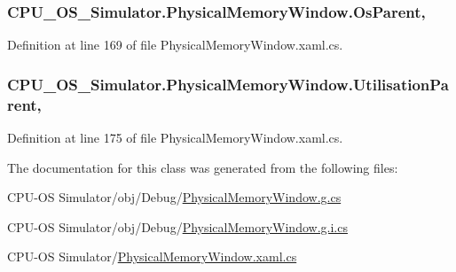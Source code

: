 \hypertarget{class_c_p_u___o_s___simulator_1_1_physical_memory_window_a0a61a168c75bdc6c63c3cff40018bab1}{}
\subsubsection[{Os\+Parent}]{ C\+P\+U\+\_\+\+O\+S\+\_\+\+Simulator.\+Physical\+Memory\+Window.\+Os\+Parent\hspace{0.3cm}{\ttfamily [get]}, {\ttfamily [set]}}\label{class_c_p_u___o_s___simulator_1_1_physical_memory_window_a0a61a168c75bdc6c63c3cff40018bab1}


Definition at line 169 of file Physical\+Memory\+Window.\+xaml.\+cs.

\hypertarget{class_c_p_u___o_s___simulator_1_1_physical_memory_window_a94864d8709996e908fbaff4056eba5a4}{}
\subsubsection[{Utilisation\+Parent}]{ C\+P\+U\+\_\+\+O\+S\+\_\+\+Simulator.\+Physical\+Memory\+Window.\+Utilisation\+Parent\hspace{0.3cm}{\ttfamily [get]}, {\ttfamily [set]}}\label{class_c_p_u___o_s___simulator_1_1_physical_memory_window_a94864d8709996e908fbaff4056eba5a4}


Definition at line 175 of file Physical\+Memory\+Window.\+xaml.\+cs.



The documentation for this class was generated from the following files\+:\begin{DoxyCompactItemize}
\item 
C\+P\+U-\/\+O\+S Simulator/obj/\+Debug/\hyperlink{_physical_memory_window_8g_8cs}{Physical\+Memory\+Window.\+g.\+cs}\item 
C\+P\+U-\/\+O\+S Simulator/obj/\+Debug/\hyperlink{_physical_memory_window_8g_8i_8cs}{Physical\+Memory\+Window.\+g.\+i.\+cs}\item 
C\+P\+U-\/\+O\+S Simulator/\hyperlink{_physical_memory_window_8xaml_8cs}{Physical\+Memory\+Window.\+xaml.\+cs}\end{DoxyCompactItemize}
